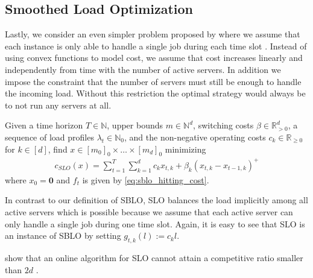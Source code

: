 \subsection{Smoothed Load Optimization}

Lastly, we consider an even simpler problem proposed by \citeauthor*{Albers2021} where we assume that each instance is only able to handle a single job during each time slot \cite{Albers2021}. Instead of using convex functions to model cost, we assume that cost increases linearly and independently from time with the number of active servers. In addition we impose the constraint that the number of servers must still be enough to handle the incoming load. Without this restriction the optimal strategy would always be to not run any servers at all.

\begin{problem}\label{problem:sblo}
Given a time horizon $T \in \mathbb{N}$, upper bounds $m \in \mathbb{N}^d$, switching costs $\beta \in \mathbb{R}_{>0}^d$, a sequence of load profiles $\lambda_t \in \mathbb{N}_0$, and the non-negative operating costs $c_k \in \mathbb{R}_{\geq 0}$ for $k \in [d]$, find $x \in [m_0]_0 \times \dots \times [m_d]_0$ minimizing \begin{align*}
    c_{SLO}(x) = \sum_{t=1}^T \sum_{k=1}^d c_k x_{t,k} + \beta_k (x_{t,k} - x_{t-1,k})^+
\end{align*}
where $x_0 = \mathbf{0}$ and $f_t$ is given by \autoref{eq:sblo_hitting_cost}.
\end{problem}

In contrast to our definition of SBLO, SLO balances the load implicitly among all active servers which is possible because we assume that each active server can only handle a single job during one time slot. Again, it is easy to see that SLO is an instance of SBLO by setting $g_{t,k}(l) := c_k l$.

\citeauthor*{Albers2021} show that an online algorithm for SLO cannot attain a competitive ratio smaller than $2d$ \cite{Albers2021}.
